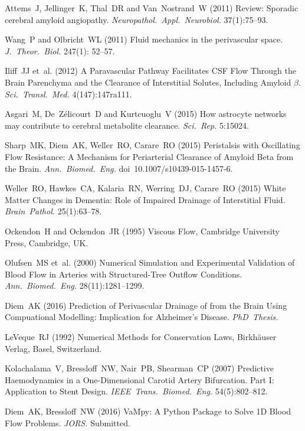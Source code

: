 \documentclass[a4paper,titlepage]{scrartcl}
\begin{document}
\begin{thebibliography}{10}
Attems~J, Jellinger~K, Thal~DR and Van~Nostrand~W (2011) Review: Sporadic cerebral amyloid angiopathy. {\em Neuropathol.~Appl.~Neurobiol.} 37(1):75--93.

Wang~P and Olbricht~WL (2011) Fluid mechanics in the perivascular space. {\em J.~Theor.~Biol.} 247(1): 52--57.

Iliff~JJ et~al. (2012) A Paravascular Pathway Facilitates CSF Flow Through the Brain Parenchyma and the Clearance of Interstitial Solutes, Including Amyloid $\beta$. {\em Sci.~Transl.~Med.} 4(147):147ra111.

Asgari~M, De~Z\'elicourt~D and Kurtcuoglu~V (2015) How astrocyte networks may contribute to cerebral metabolite clearance. {\em Sci.~Rep.} 5:15024.

Sharp~MK, Diem~AK, Weller~RO, Carare~RO (2015) Peristalsis with Oscillating Flow Resistance: A Mechanism for Periarterial Clearance of Amyloid Beta from the Brain. {\em Ann.~Biomed.~Eng.} doi~10.1007/s10439-015-1457-6.

Weller~RO, Hawkes~CA, Kalaria~RN, Werring~DJ, Carare~RO (2015) White Matter Changes in Dementia: Role of Impaired Drainage of Interstitial Fluid. {\em Brain~Pathol.} 25(1):63--78.

Ockendon~H and Ockendon~JR (1995) Viscous Flow, Cambridge University Press, Cambridge, UK.

Olufsen~MS et~al. (2000) Numerical Simulation and Experimental Validation of Blood Flow in Arteries with Structured-Tree Outflow Conditions. {\em Ann.~Biomed.~Eng.} 28(11):1281--1299.

Diem~AK (2016) Prediction of Perivascular Drainage of \Ab from the Brain Using Compuational Modelling: Implication for Alzheimer's Disease. {\em PhD~Thesis.}

LeVeque~RJ (1992) Numerical Methods for Conservation Laws, Birkh\"auser Verlag, Basel, Switzerland.

Kolachalama~V, Bressloff~NW, Nair~PB, Shearman~CP (2007) Predictive Haemodynamics in a One-Dimensional Carotid Artery Bifurcation. Part I: Application to Stent Design. {\em IEEE~Trans.~Biomed.~Eng.} 54(5):802--812.

Diem~AK, Bressloff~NW (2016) VaMpy: A Python Package to Solve 1D Blood Flow Problems. {\em JORS.} Submitted.


\end{thebibliography}
\end{document}
